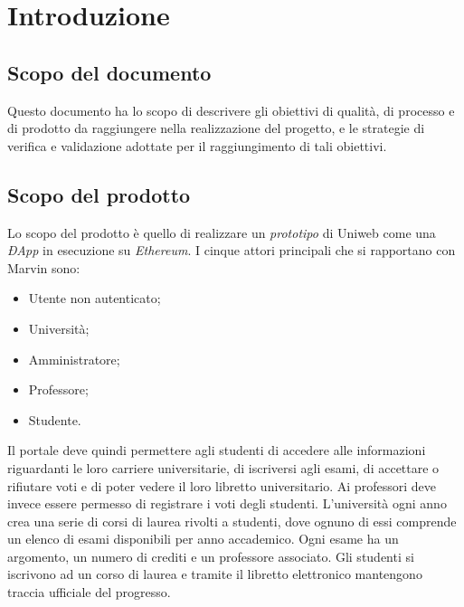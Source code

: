 \section{Introduzione}
\subsection{Scopo del documento}
Questo documento ha lo scopo di descrivere gli obiettivi di qualità, di processo e di prodotto da raggiungere nella realizzazione del progetto, e le strategie di verifica e validazione adottate per il raggiungimento di tali obiettivi.
\subsection{Scopo del prodotto}
\begin{comment}
L'obiettivo di Marvin è di realizzare un \textit{prototipo}\ped{G} di Uniweb come \textit{ÐApp}\ped{G} che giri su \textit{Ethereum}\ped{G}. Gli attori principali che si rapportano con Marvin sono:
\begin{enumerate}
	\item Università;
	\item Professori;
	\item Studenti.
\end{enumerate}
Il portale deve quindi permettere agli studenti di accedere alle informazioni riguardanti le loro carriere universitarie, di iscriversi agli esami, di accettare o rifiutare voti e di poter vedere il loro libretto universitario.
Ai professori deve invece essere permesso registrare i voti degli studenti.
L'università ogni anno crea una serie di corsi di laurea rivolti a studenti, dove ognuno di essi comprende un elenco di esami disponibili per anno accademico. Ogni esame ha un argomento, un numero di crediti e un professore associato. Gli studenti si iscrivono ad un corso di laurea e tramite il libretto elettronico mantengono traccia ufficiale del progresso.
\end{comment}
Lo scopo del prodotto è quello di realizzare un \emph{prototipo} di Uniweb come una \emph{ÐApp} in esecuzione su \emph{Ethereum}. I cinque attori principali che si rapportano con Marvin sono:
\begin{itemize}
	\item Utente non autenticato; 
	\item Università;
	\item Amministratore;
	\item Professore;
	\item Studente.
\end{itemize} 
Il portale deve quindi permettere agli studenti di accedere alle informazioni riguardanti le loro carriere universitarie, di iscriversi agli esami, di accettare o rifiutare voti e di poter vedere il loro libretto universitario.
Ai professori deve invece essere permesso di registrare i voti degli studenti.
L'università ogni anno crea una serie di corsi di laurea rivolti a studenti, dove ognuno di essi comprende un elenco di esami disponibili per anno accademico. Ogni esame ha un argomento, un numero di crediti e un professore associato. Gli studenti si iscrivono ad un corso di laurea e tramite il libretto elettronico mantengono traccia ufficiale del progresso.
